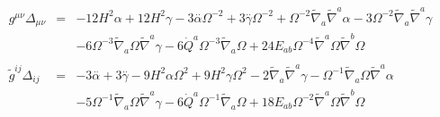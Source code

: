 \documentclass[10pt,letterpaper]{article}
\numberwithin{equation}{section}
\begin{document}
\begin{eqnarray}
g^{\mu\nu}\Delta_{\mu\nu}&=& -12 H^2 \alpha + 12 H^2 \gamma - 3 \overset{..}{\alpha} \Omega^{-2} + 3 \overset{..}{\gamma} \Omega^{-2} + \Omega^{-2} \tilde{\nabla}_{a}\tilde{\nabla}^{a}\alpha - 3 \Omega^{-2} \tilde{\nabla}_{a}\tilde{\nabla}^{a}\gamma \nonumber \\ 
&& - 6 \Omega^{-3} \tilde{\nabla}_{a}\Omega \tilde{\nabla}^{a}\gamma -6 \dot{Q}^{a} \Omega^{-3} \tilde{\nabla}_{a}\Omega +24 E_{ab} \Omega^{-4} \tilde{\nabla}^{a}\Omega \tilde{\nabla}^{b}\Omega 
\\  \nonumber\\ 
\tilde g^{ij}\Delta_{ij}&=& -3 \overset{..}{\alpha} + 3 \overset{..}{\gamma} - 9 H^2 \alpha \Omega^2 + 9 H^2 \gamma \Omega^2 - 2 \tilde{\nabla}_{a}\tilde{\nabla}^{a}\gamma -  \Omega^{-1} \tilde{\nabla}_{a}\Omega \tilde{\nabla}^{a}\alpha \nonumber \\ 
&& - 5 \Omega^{-1} \tilde{\nabla}_{a}\Omega \tilde{\nabla}^{a}\gamma -6 \dot{Q}^{a} \Omega^{-1} \tilde{\nabla}_{a}\Omega +18 E_{ab} \Omega^{-2} \tilde{\nabla}^{a}\Omega \tilde{\nabla}^{b}\Omega 
\end{eqnarray}
\end{document}
